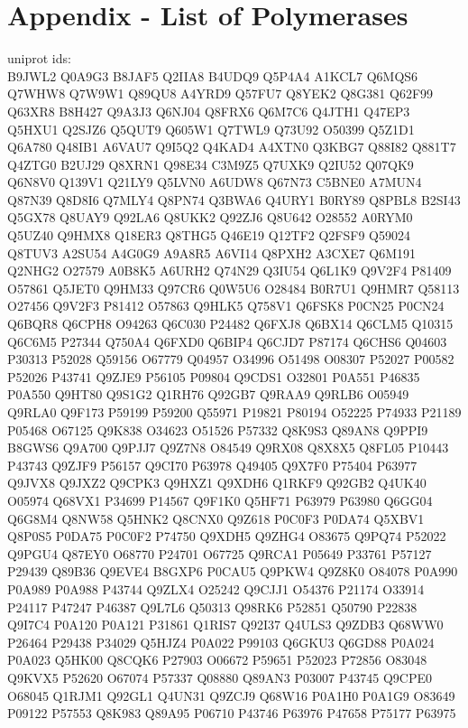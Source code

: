 \section{Appendix - List of Polymerases}

uniprot ids:\\

B9JWL2
Q0A9G3
B8JAF5
Q2IIA8
B4UDQ9
Q5P4A4
A1KCL7
Q6MQS6
Q7WHW8
Q7W9W1
Q89QU8
A4YRD9
Q57FU7
Q8YEK2
Q8G381
Q62F99
Q63XR8
B8H427
Q9A3J3
Q6NJ04
Q8FRX6
Q6M7C6
Q4JTH1
Q47EP3
Q5HXU1
Q2SJZ6
Q5QUT9
Q605W1
Q7TWL9
Q73U92
O50399
Q5Z1D1
Q6A780
Q48IB1
A6VAU7
Q9I5Q2
Q4KAD4
A4XTN0
Q3KBG7
Q88I82
Q881T7
Q4ZTG0
B2UJ29
Q8XRN1
Q98E34
C3M9Z5
Q7UXK9
Q2IU52
Q07QK9
Q6N8V0
Q139V1
Q21LY9
Q5LVN0
A6UDW8
Q67N73
C5BNE0
A7MUN4
Q87N39
Q8D8I6
Q7MLY4
Q8PN74
Q3BWA6
Q4URY1
B0RY89
Q8PBL8
B2SI43
Q5GX78
Q8UAY9
Q92LA6
Q8UKK2
Q92ZJ6
Q8U642
O28552
A0RYM0
Q5UZ40
Q9HMX8
Q18ER3
Q8THG5
Q46E19
Q12TF2
Q2FSF9
Q59024
Q8TUV3
A2SU54
A4G0G9
A9A8R5
A6VI14
Q8PXH2
A3CXE7
Q6M191
Q2NHG2
O27579
A0B8K5
A6URH2
Q74N29
Q3IU54
Q6L1K9
Q9V2F4
P81409
O57861
Q5JET0
Q9HM33
Q97CR6
Q0W5U6
O28484
B0R7U1
Q9HMR7
Q58113
O27456
Q9V2F3
P81412
O57863
Q9HLK5
Q758V1
Q6FSK8
P0CN25
P0CN24
Q6BQR8
Q6CPH8
O94263
Q6C030
P24482
Q6FXJ8
Q6BX14
Q6CLM5
Q10315
Q6C6M5
P27344
Q750A4
Q6FXD0
Q6BIP4
Q6CJD7
P87174
Q6CHS6
Q04603
P30313
P52028
Q59156
O67779
Q04957
O34996
O51498
O08307
P52027
P00582
P52026
P43741
Q9ZJE9
P56105
P09804
Q9CDS1
O32801
P0A551
P46835
P0A550
Q9HT80
Q9S1G2
Q1RH76
Q92GB7
Q9RAA9
Q9RLB6
O05949
Q9RLA0
Q9F173
P59199
P59200
Q55971
P19821
P80194
O52225
P74933
P21189
P05468
O67125
Q9K838
O34623
O51526
P57332
Q8K9S3
Q89AN8
Q9PPI9
B8GWS6
Q9A700
Q9PJJ7
Q9Z7N8
O84549
Q9RX08
Q8X8X5
Q8FL05
P10443
P43743
Q9ZJF9
P56157
Q9CI70
P63978
Q49405
Q9X7F0
P75404
P63977
Q9JVX8
Q9JXZ2
Q9CPK3
Q9HXZ1
Q9XDH6
Q1RKF9
Q92GB2
Q4UK40
O05974
Q68VX1
P34699
P14567
Q9F1K0
Q5HF71
P63979
P63980
Q6GG04
Q6G8M4
Q8NW58
Q5HNK2
Q8CNX0
Q9Z618
P0C0F3
P0DA74
Q5XBV1
Q8P0S5
P0DA75
P0C0F2
P74750
Q9XDH5
Q9ZHG4
O83675
Q9PQ74
P52022
Q9PGU4
Q87EY0
O68770
P24701
O67725
Q9RCA1
P05649
P33761
P57127
P29439
Q89B36
Q9EVE4
B8GXP6
P0CAU5
Q9PKW4
Q9Z8K0
O84078
P0A990
P0A989
P0A988
P43744
Q9ZLX4
O25242
Q9CJJ1
O54376
P21174
O33914
P24117
P47247
P46387
Q9L7L6
Q50313
Q98RK6
P52851
Q50790
P22838
Q9I7C4
P0A120
P0A121
P31861
Q1RIS7
Q92I37
Q4ULS3
Q9ZDB3
Q68WW0
P26464
P29438
P34029
Q5HJZ4
P0A022
P99103
Q6GKU3
Q6GD88
P0A024
P0A023
Q5HK00
Q8CQK6
P27903
O06672
P59651
P52023
P72856
O83048
Q9KVX5
P52620
O67074
P57337
Q08880
Q89AN3
P03007
P43745
Q9CPE0
O68045
Q1RJM1
Q92GL1
Q4UN31
Q9ZCJ9
Q68W16
P0A1H0
P0A1G9
O83649
P09122
P57553
Q8K983
Q89A95
P06710
P43746
P63976
P47658
P75177
P63975
